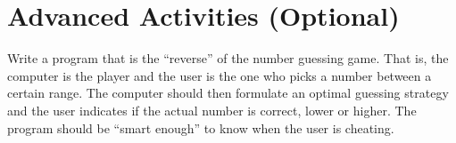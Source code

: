 \documentclass[12pt]{scrartcl}
\begin{document}
\section{Advanced Activities (Optional)}

Write a program that is the ``reverse'' of the number guessing game.
That is, the computer is the player and the user is the one who
picks a number between a certain range.  The computer should
then formulate an optimal guessing strategy and the user indicates
if the actual number is correct, lower or higher.  The program
should be ``smart enough'' to know when the user is cheating.
\end{document}
